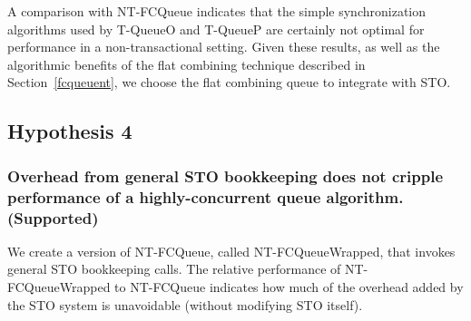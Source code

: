 A comparison with NT-FCQueue indicates that the simple synchronization algorithms used by T-QueueO and T-QueueP are certainly not optimal for performance in a non-transactional setting.
Given these results, as well as the algorithmic benefits of the flat combining technique described in Section~\ref{fcqueuent}, we choose the flat combining queue to integrate with STO.

\vspace{12pt}
\noindent{}

\subsection{Hypothesis 4}
\subsubsection{Overhead from general STO bookkeeping does not cripple performance of a highly-concurrent queue algorithm. (Supported)}

We create a version of NT-FCQueue, called NT-FCQueueWrapped, that invokes general STO bookkeeping calls. The relative performance of NT-FCQueueWrapped to NT-FCQueue indicates how much of the overhead added by the STO system is unavoidable (without modifying STO itself). 

